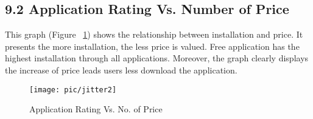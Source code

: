 \documentclass{article}
\begin{document}
\subsection*{9.2 Application Rating Vs. Number of Price}
This graph (Figure ~\ref{fig:11}) shows the relationship between installation and price. It presents the more installation, the less price is valued. Free application has the highest installation through all applications. Moreover, the graph clearly displays the increase of price leads users less download the application.
\begin{figure}
\centering
\texttt{[image: pic/jitter2]}
\caption{Application Rating Vs. No. of Price} 
\label{fig:11}
\end{figure}
\end{document}
